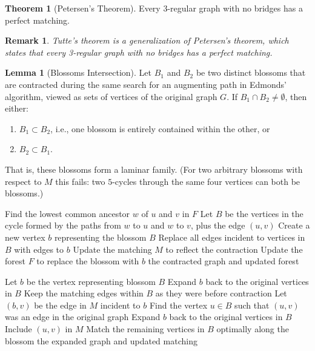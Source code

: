 \documentclass{article}
\newtheorem{remark}{Remark}
\theoremstyle{definition}
\newtheorem{theorem}{Theorem}
\newtheorem{lemma}{Lemma}
\begin{document}
\begin{theorem}[Petersen's Theorem]
Every 3-regular graph with no bridges has a perfect matching.
\end{theorem}

\begin{remark}
Tutte's theorem is a generalization of Petersen's theorem, which states that every 3-regular graph with no bridges has a perfect matching.
\end{remark}

\begin{lemma}[Blossoms Intersection]
Let $B_1$ and $B_2$ be two distinct blossoms that are contracted during the same search for an augmenting path in Edmonds' algorithm, viewed as sets of vertices of the original graph $G$. If $B_1 \cap B_2 \neq \emptyset$, then either:
\begin{enumerate}
  \item $B_1 \subset B_2$, i.e., one blossom is entirely contained within the other, or
  \item $B_2 \subset B_1$.
\end{enumerate}
That is, these blossoms form a laminar family. (For two arbitrary blossoms with respect to $M$ this fails: two $5$-cycles through the same four vertices can both be blossoms.)
\end{lemma}

\begin{algorithm}
\caption{Contract Blossom}
\begin{algorithmic}[1]
    \State Find the lowest common ancestor $w$ of $u$ and $v$ in $F$
    \State Let $B$ be the vertices in the cycle formed by the paths from $w$ to $u$ and $w$ to $v$, plus the edge $(u, v)$
    \State Create a new vertex $b$ representing the blossom $B$
    \State Replace all edges incident to vertices in $B$ with edges to $b$
    \State Update the matching $M$ to reflect the contraction
    \State Update the forest $F$ to replace the blossom with $b$
    \State \Return the contracted graph and updated forest
\EndProcedure
\end{algorithmic}
\end{algorithm}

\begin{algorithm}
\caption{Expand Blossom}
\begin{algorithmic}[1]
    \State Let $b$ be the vertex representing blossom $B$
        \State Expand $b$ back to the original vertices in $B$
        \State Keep the matching edges within $B$ as they were before contraction
    \Else
        \State Let $(b, v)$ be the edge in $M$ incident to $b$
        \State Find the vertex $u \in B$ such that $(u, v)$ was an edge in the original graph
        \State Expand $b$ back to the original vertices in $B$
        \State Include $(u, v)$ in $M$
        \State Match the remaining vertices in $B$ optimally along the blossom
    \EndIf
    \State \Return the expanded graph and updated matching
\EndProcedure
\end{algorithmic}
\end{algorithm}
\end{document}
